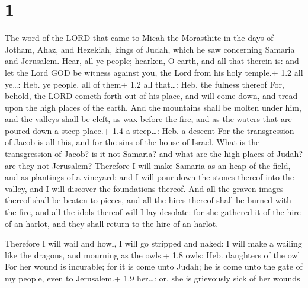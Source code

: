 \hypertarget{section}{%
\section{1}\label{section}}

 The word of the LORD that came to Micah the Morasthite in
the days of Jotham, Ahaz, and Hezekiah, kings of Judah, which he saw
concerning Samaria and Jerusalem.  Hear, all ye people;
hearken, O earth, and all that therein is: and let the Lord GOD be
witness against you, the Lord from his holy temple.+ 1.2 all ye\ldots:
Heb. ye people, all of them+ 1.2 all that\ldots: Heb. the fulness
thereof  For, behold, the LORD cometh forth out of his
place, and will come down, and tread upon the high places of the earth.
 And the mountains shall be molten under him, and the
valleys shall be cleft, as wax before the fire, and as the waters that
are poured down a steep place.+ 1.4 a steep\ldots: Heb. a descent
 For the transgression of Jacob is all this, and for the
sins of the house of Israel. What is the transgression of Jacob? is it
not Samaria? and what are the high places of Judah? are they not
Jerusalem?  Therefore I will make Samaria as an heap of the
field, and as plantings of a vineyard: and I will pour down the stones
thereof into the valley, and I will discover the foundations thereof.
 And all the graven images thereof shall be beaten to
pieces, and all the hires thereof shall be burned with the fire, and all
the idols thereof will I lay desolate: for she gathered it of the hire
of an harlot, and they shall return to the hire of an harlot.

 Therefore I will wail and howl, I will go stripped and
naked: I will make a wailing like the dragons, and mourning as the
owls.+ 1.8 owls: Heb. daughters of the owl  For her wound is
incurable; for it is come unto Judah; he is come unto the gate of my
people, even to Jerusalem.+ 1.9 her\ldots: or, she is grievously sick of
her wounds


